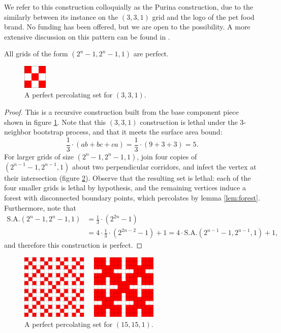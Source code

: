 We refer to this construction colloquially as the Purina construction, due to the similarly between its instance on the $(3,3,1)$ grid and the logo of the pet food brand. No funding has been offered, but we are open to the possibility. A more extensive discussion on this pattern can be found in \cite{benevides:2021}.

\begin{con}
\label{con:purina}
All grids of the form $(2^n-1, 2^n-1, 1)$ are perfect.
\end{con}

\begin{figure}[]
\centering
\includegraphics[width=0.1\textwidth]{figures/4/3x3x1.pdf}
\caption{A perfect percolating set for $(3,3,1)$.}
\label{fig:3x3x1}
\end{figure} 

\begin{proof}
This is a recursive construction built from the base component piece shown in figure \ref{fig:3x3x1}. Note that this $(3,3,1)$ construction is lethal under the 3-neighbor bootstrap process, and that it meets the surface area bound:
$$\frac{1}{3} \cdot (ab+bc+ca) = \frac{1}{3} \cdot (9 + 3 + 3) = 5.$$
For larger grids of size $(2^n-1, 2^n-1, 1)$, join four copies of $(2^{n-1}-1, 2^{n-1}, 1)$ about two perpendicular corridors, and infect the vertex at their intersection (figure \ref{fig:15x15x1}). Observe that the resulting set is lethal: each of the four smaller grids is lethal by hypothesis, and the remaining vertices induce a forest with disconnected boundary points, which percolates by lemma \ref{lem:forest}. Furthermore, note that
\begin{align*}
\text{S.A.}(2^n-1,2^n-1,1) &= \frac{1}{3} \cdot (2^{2n}-1) \\
&= 4 \cdot \frac{1}{3} \cdot (2^{2n-2} -1) + 1 = 4 \cdot \text{S.A.}(2^{n-1}-1, 2^{n-1}, 1) + 1,
\end{align*}
and therefore this construction is perfect.
\end{proof}

\begin{figure}[]
\centering
\includegraphics[width=0.6\textwidth]{figures/4/15x15x1.pdf}
\caption{A perfect percolating set for $(15,15,1)$.}
\label{fig:15x15x1}
\end{figure} 

